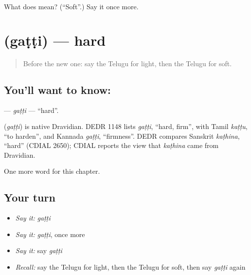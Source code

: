 \begin{tcolorbox}[breakable,colback=teal!4,colframe=teal!35!black,title={Before you move on}]
What does  mean? (\textquotedblleft{}Soft\textquotedblright{}.) Say it once more.
\end{tcolorbox}
\section[\texorpdfstring{\te{గట్టి} (gaṭṭi)}{గట్టి (gaṭṭi)}]{ (gaṭṭi) — hard}

\label{lesson:TE-C137-gatti}



\begin{quote}
Before the new one: say the Telugu for light, then the Telugu for soft.
\end{quote}

\subsection*{You'll want to know: }
\textbf{} — \emph{gaṭṭi} — \textquotedblleft{}hard\textquotedblright{}.

\begin{cousinweb}
\textbf{} (\emph{gaṭṭi}) is native Dravidian. DEDR 1148 lists \emph{gaṭṭi}, \textquotedblleft{}hard, firm\textquotedblright{}, with Tamil \emph{kaṭṭu}, \textquotedblleft{}to harden\textquotedblright{}, and Kannada \emph{gaṭṭi}, \textquotedblleft{}firmness\textquotedblright{}. DEDR compares Sanskrit \emph{kaṭhina}, \textquotedblleft{}hard\textquotedblright{} (CDIAL 2650); CDIAL reports the view that \emph{kaṭhina} came from Dravidian.
\end{cousinweb}

\begin{grammarlens}[title={What you've built}]
One more word for this chapter.
\end{grammarlens}

\subsection*{Your turn}
\begin{itemize}
\raggedright
  \item \emph{Say it:} \emph{gaṭṭi}
  \item \emph{Say it:} \emph{gaṭṭi}, once more
  \item \emph{Say it:} say \emph{gaṭṭi}
  \item \emph{Recall:} say the Telugu for light, then the Telugu for soft, then say \emph{gaṭṭi} again
\end{itemize}

